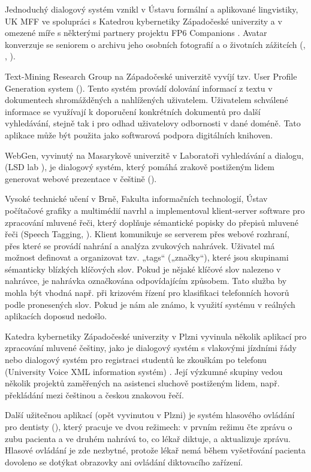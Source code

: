 \begin{multicols}{2}
Jednoduchý dialogový systém vznikl v Ústavu formální a aplikované lingvistiky, UK MFF ve spolupráci s Katedrou kybernetiky Západočeské univerzity a v omezené míře s některými partnery projektu FP6 Companions \cite{Note21}. Avatar konverzuje se seniorem o archivu jeho osobních fotografií a o životních zážitcích (\cite{Ptacek2010}, \cite{Romportl2010}, \cite{GruberTihelka2010}).

Text-Mining Research Group na Západočeské univerzitě vyvíjí tzv. User Profile Generation system (\cite{Grolmus2003}). Tento systém provádí dolování informací z textu v dokumentech shromážděných a nahlížených uživatelem. Uživatelem schválené informace se využívají k doporučení konkrétních dokumentů pro další vyhledávání, stejně tak i pro odhad uživatelovy odbornosti v dané doméně. Tato aplikace může být použita jako softwarová podpora digitálních knihoven.

WebGen, vyvinutý na Masarykově univerzitě v Laboratoři vyhledávání a dialogu, (LSD lab \cite{Note22}), je dialogový systém, který pomáhá zrakově postiženým lidem generovat webové prezentace v češtině (\cite{BartekPlhak2008}).

Vysoké technické učení v Brně, Fakulta informačních technologií, Ústav počítačové grafiky a multimédií navrhl a implementoval klient-server software pro zpracování mluvené řeči, který doplňuje sémantické popisky do přepisů mluvené řeči (Speech Tagging, \cite{Smrz2010}). Klient komunikuje se serverem přes webové rozhraní, přes které se provádí nahrání a analýza zvukových nahrávek. Uživatel má možnost definovat a organizovat tzv. „tags“ („značky“), které jsou skupinami sémanticky blízkých klíčových slov. Pokud je nějaké klíčové slov nalezeno v nahrávce, je nahrávka označkována odpovídajícím způsobem. Tato služba by mohla být vhodná např. při krizovém řízení pro klasifikaci telefonních hovorů podle pronesených slov. Pokud je nám ale známo, k využití systému v reálných aplikacích doposud nedošlo.

Katedra kybernetiky Západočeské univerzity v Plzni vyvinula několik aplikací pro zpracování mluvené češtiny, jako je dialogový systém s vlakovými jízdními řády nebo dialogový systém pro registraci studentů ke zkouškám po telefonu (University Voice XML information systém) \cite{Note24}. Její výzkumné skupiny vedou několik projektů zaměřených na asistenci sluchově postiženým lidem, např. překládání mezi češtinou a českou znakovou řečí.

Další užitečnou aplikací (opět vyvinutou v Plzni) je systém hlasového ovládání pro dentisty (\cite{Nagy2008}), který pracuje ve dvou režimech: v prvním režimu čte zprávu o zubu pacienta a ve druhém nahrává to, co lékař diktuje, a aktualizuje zprávu. Hlasové ovládání je zde nezbytné, protože lékař nemá během vyšetřování pacienta dovoleno se dotýkat obrazovky ani ovládání diktovacího zařízení.


\end{multicols}
